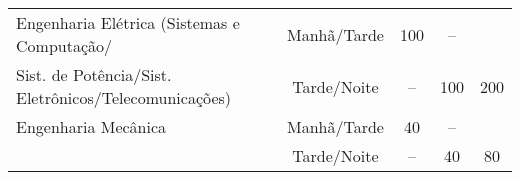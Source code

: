 \begin{table}[!ht]
\begin{tabularx}{0.9\textwidth}{Xcccc}
		\hline
		Engenharia Elétrica (Sistemas e Computação/           & Manhã/Tarde    & 100                                & --                                 &                \\
		Sist. de Potência/Sist. Eletrônicos/Telecomunicações) & Tarde/Noite    & --                                 & 100                                & 200            \\
		\hline
		Engenharia Mecânica                                   & Manhã/Tarde    & 40                                 & --                                 &                \\
		                                                      & Tarde/Noite    & --                                 & 40                                 & 80             \\
		\bottomrule
	\end{tabularx}
\end{table}

